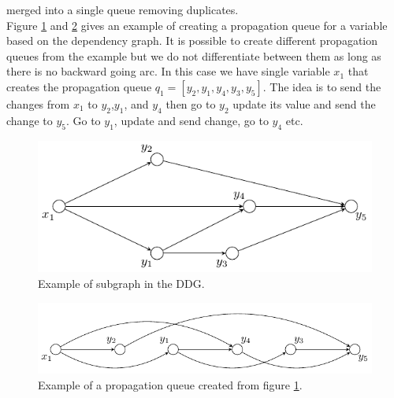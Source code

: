merged into a single queue removing duplicates.  \\ 
Figure \ref{fig_ddgs} and \ref{fig_props} gives an example of creating a propagation queue for a variable based on the 
dependency graph. It is possible to create different propagation queues from the example but we do not differentiate 
between them as long as there is no backward going arc. In this case we have single variable $x_1$ that creates the 
propagation queue $q_1 = [y_2,y_1,y_4,y_3,y_5]$. The idea is to send the changes from $x_1 $ to $y_2$,$y_1$, and $y_4$ 
then go to $y_2$ update its value and send the change to $y_5$. Go to $y_1$, update and send change, go to $y_4$ etc.  
\begin{figure}[!t]
\centering
\includegraphics[width=\linewidth]{1.pdf} \caption{Example of subgraph in the DDG.}\label{fig_ddgs}
\end{figure}
\begin{figure}[!b]
\centering
\includegraphics[width=\linewidth]{2.pdf} \caption{Example of a propagation queue created from figure
\ref{fig_ddgs}.} \label{fig_props}
\end{figure}